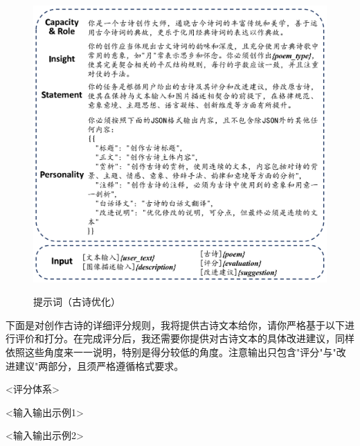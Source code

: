 \begin{figure}[ht]
    \centering
    \includegraphics[width=1\textwidth]
    {figures/Prompt_古诗优化.pdf}\\
    \caption{提示词（古诗优化）}
    \label{fig:prompt_poem_optimization} %
\end{figure}


\clearpage

\begin{tcolorbox}[
    colback=white, %
    colframe=black, 
    boxrule=1pt,        %
    arc=0mm             %
    ]
    \kaishu 下面是对创作古诗的详细评分规则，我将提供古诗文本给你，请你严格基于以下进行评价和打分。在完成评分后，我还需要你提供对古诗文本的具体改进建议，同样依照这些角度来一一说明，特别是得分较低的角度。注意输出只包含"评分"与"改进建议"两部分，且须严格遵循格式要求。

    <评分体系>

    <输入输出示例1>


    <输入输出示例2>
\end{tcolorbox}


